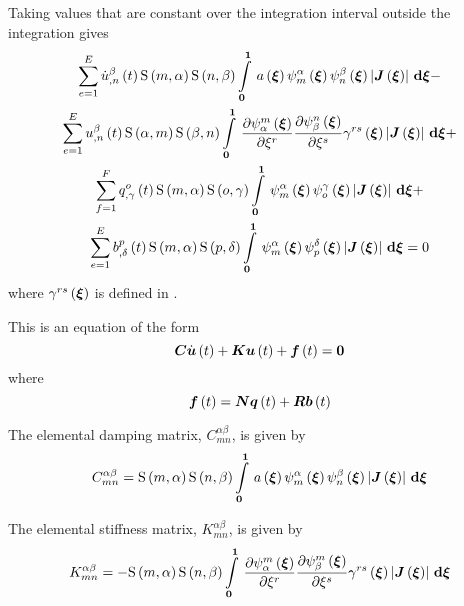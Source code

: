 Taking values that are constant over the integration interval outside the
integration gives
\begin{multline}
  \dsum_{e=1}^{E}\fnof{\nodedof{\dot{u}}{\beta}{n}}{t}\gsf{m}{\alpha}\gsf{n}{\beta}
  \gint{\vectr{0}}{\vectr{1}}{\fnof{a}{\vectr{\xi}}
    \gbfn{m}{\alpha}{\vectr{\xi}}\gbfn{n}{\beta}{\vectr{\xi}}
    \abs{\fnof{\matr{J}}{\vectr{\xi}}}}{\vectr{\xi}} - \\
  \dsum_{e=1}^{E}\fnof{\nodedof{u}{\beta}{n}}{t}\gsf{\alpha}{m}\gsf{\beta}{n}
  \gint{\vectr{0}}{\vectr{1}}{\delby{\gbfn{\alpha}{m}{\vectr{\xi}}}{\xi^{r}}
  \delby{\gbfn{\beta}{n}{\vectr{\xi}}}{\xi^{s}}\fnof{\gamma^{rs}}{\vectr{\xi}}
  \abs{\fnof{\matr{J}}{\vectr{\xi}}}}{\vectr{\xi}} + \\
  \dsum_{f=1}^{F}\fnof{\nodedof{q}{o}{\gamma}}{t}\gsf{m}{\alpha}\gsf{o}{\gamma}
  \gint{\vectr{0}}{\vectr{1}}{\gbfn{m}{\alpha}{\vectr{\xi}}\gbfn{o}{\gamma}{\vectr{\xi}}
    \abs{\fnof{\matr{J}}{\vectr{\xi}}}}{\vectr{\xi}} + \\
  \dsum_{e=1}^{E}\fnof{\nodedof{b}{p}{\delta}}{t}\gsf{m}{\alpha}\gsf{p}{\delta}
  \gint{\vectr{0}}{\vectr{1}}{\gbfn{m}{\alpha}{\vectr{\xi}}\gbfn{p}{\delta}{\vectr{\xi}}
    \abs{\fnof{\matr{J}}{\vectr{\xi}}}}{\vectr{\xi}} = 0
  \label{eqn:diffusionspatialintegration1}
\end{multline}
where $ \gamma^{rs}\left( \boldsymbol{\xi} \right) $ is defined in 
.

This is an equation of the form
\begin{equation}
  \matr{C}\fnof{\dot{\vect{u}}}{t}+\matr{K}\fnof{\vect{u}}{t}+\fnof{\vect{f}}{t}=\vect{0}
\end{equation}
where
\begin{equation}
  \fnof{\vect{f}}{t}=\matr{N}\fnof{\vect{q}}{t}+\matr{R}\fnof{\vect{b}}{t}
\end{equation}

The elemental damping matrix, $C^{\alpha\beta}_{mn}$, is given by
\begin{equation}
  C^{\alpha\beta}_{mn} =
  \gsf{m}{\alpha}\gsf{n}{\beta}\gint{\vectr{0}}{\vectr{1}}{\fnof{a}{\vectr{\xi}}
    \gbfn{m}{\alpha}{\vectr{\xi}}\gbfn{n}{\beta}{\vectr{\xi}}
    \abs{\fnof{\matr{J}}{\vectr{\xi}}}}{\vectr{\xi}}
\end{equation}

The elemental stiffness matrix, $K^{\alpha\beta}_{mn}$, is given by
\begin{equation}
  K^{\alpha\beta}_{mn} = -\gsf{m}{\alpha}\gsf{n}{\beta}\gint{\vectr{0}}{\vectr{1}}{
    \delby{\gbfn{\alpha}{m}{\vectr{\xi}}}{\xi^{r}}\delby{\gbfn{\beta}{m}{\vectr{\xi}}}{\xi^{s}}
    \fnof{\gamma^{rs}}{\vectr{\xi}}\abs{\fnof{\matr{J}}{\vectr{\xi}}}}{\vectr{\xi}}
\end{equation}

